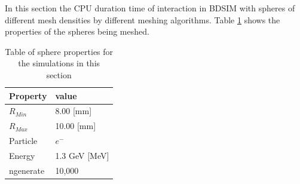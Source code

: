 \documentclass[12pt,a4paper]{article}
\begin{document}
In this section the CPU duration time of interaction in BDSIM with spheres of different mesh densities by different meshing algorithms. Table \ref{tab1} shows the properties of the spheres being meshed.
 
\begin{table}[h!]
\centering
\begin{tabular}{|l|l|}
\hline
Property & value \\ \hline
$R_{Min}$ &  8.00 [mm]\\ \hline
$R_{Max}$ &  10.00 [mm]\\ \hline
Particle &  $e^-$\\ \hline
Energy & 1.3 GeV [MeV]\\ \hline
ngenerate & 10,000\\ \hline
\end{tabular}
\caption{Table of sphere properties for the simulations in this section}
\label{tab1}
\end{table}
\end{document}

